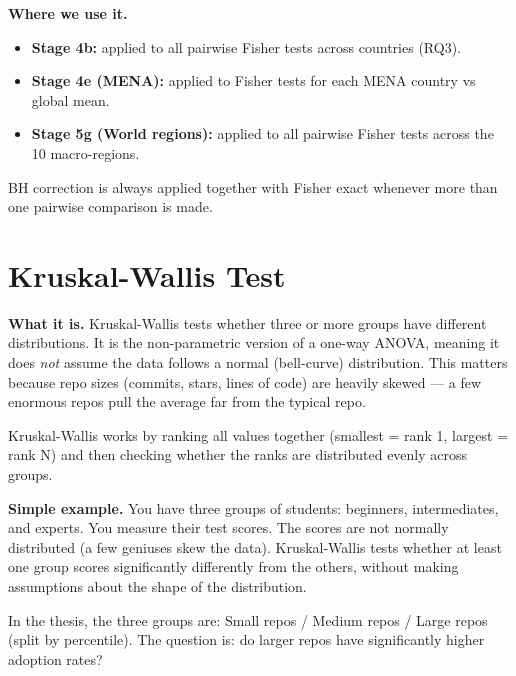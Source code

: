 \documentclass[11pt,a4paper]{article}
\begin{document}
\begin{wherebox}
\textbf{Where we use it.}
\begin{itemize}
  \item \textbf{Stage 4b:} applied to all pairwise Fisher tests across countries (RQ3).
  \item \textbf{Stage 4e (MENA):} applied to Fisher tests for each MENA country vs global mean.
  \item \textbf{Stage 5g (World regions):} applied to all pairwise Fisher tests across
        the 10 macro-regions.
\end{itemize}
BH correction is always applied together with Fisher exact whenever more than one pairwise
comparison is made.
\end{wherebox}

\section{Kruskal-Wallis Test}

\begin{conceptbox}
\textbf{What it is.}
Kruskal-Wallis tests whether three or more groups have different distributions.
It is the non-parametric version of a one-way ANOVA, meaning it does \emph{not} assume
the data follows a normal (bell-curve) distribution. This matters because repo sizes
(commits, stars, lines of code) are heavily skewed --- a few enormous repos pull the
average far from the typical repo.

\medskip
Kruskal-Wallis works by ranking all values together (smallest = rank 1, largest = rank N)
and then checking whether the ranks are distributed evenly across groups.

\medskip
\textbf{Simple example.}
You have three groups of students: beginners, intermediates, and experts. You measure their
test scores. The scores are not normally distributed (a few geniuses skew the data). Kruskal-Wallis
tests whether at least one group scores significantly differently from the others, without
making assumptions about the shape of the distribution.

\medskip
In the thesis, the three groups are: Small repos / Medium repos / Large repos (split by percentile).
The question is: do larger repos have significantly higher adoption rates?
\end{conceptbox}
\end{document}
